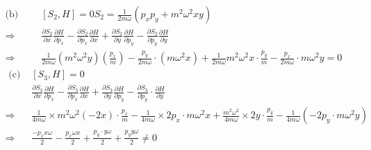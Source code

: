 \begin{enumerate}
\begin{answer}
\begin{align*}
	\text{(b) }&\quad \left[S_{2}, H\right]=0
	S_{2}=\frac{1}{2 m \omega}\left(p_{x} p_{y}+m^{2} \omega^{2} x y\right)\\
	\Rightarrow &\quad \frac{\partial S_{2}}{\partial x} \frac{\partial H}{\partial p_{x}}-\frac{\partial S_{2}}{\partial p_{x}} \frac{\partial H}{\partial x}+\frac{\partial S_{2}}{\partial y} \frac{\partial H}{\partial p_{y}}-\frac{\partial S_{2}}{\partial p_{y}} \frac{\partial H}{\partial y}\\
	\Rightarrow &\quad \frac{1}{2 m \omega}\left(m^{2} \omega^{2} y\right)\left(\frac{p_{x}}{m}\right)-\frac{p_{y}}{2 m \omega} \cdot\left(m \omega^{2} x\right)+\frac{1}{2 m \omega} m^{2} \omega^{2} x \cdot \frac{p_{y}}{m}-\frac{p_{x}}{2 m \omega} \cdot m \omega^{2} y=0\\
	\text { (c) }&\left[S_{3}, H\right]=0\\
	&\frac{\partial S_{3}}{\partial x} \frac{\partial H}{\partial p_{x}}-\frac{\partial S_{3}}{\partial p_{x}} \frac{\partial H}{\partial x}+\frac{\partial S_{3}}{\partial y} \frac{\partial H}{\partial p_{y}}-\frac{\partial S_{3}}{\partial p_{y}} \cdot \frac{\partial H}{\partial y}\\
	\Rightarrow &\frac{1}{4 m \omega} \times m^{2} \omega^{2}(-2 x) \cdot \frac{p_{x}}{m}-\frac{1}{4 m \omega} \times 2 p_{x} \cdot m \omega^{2} x+\frac{m^{2} \omega^{2}}{4 m \omega} \times 2 y \cdot \frac{p_{y}}{m}-\frac{1}{4 m \omega}\left(-2 p_{y} \cdot m \omega^{2} y\right)\\
	\Rightarrow &\frac{-p_{x} x \omega}{2}-\frac{p_{x} \omega x}{2}+\frac{p_{y} \cdot y \omega}{2}+\frac{p_{y} y \omega}{2} \neq 0
	\end{align*}
\end{answer}



\end{enumerate}